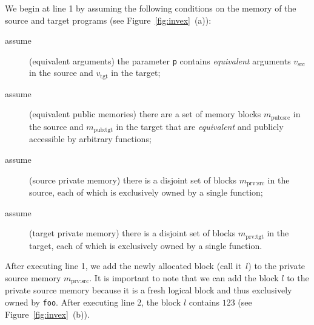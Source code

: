 We begin at line 1 by assuming the
following conditions on the memory of the source and target programs (see Figure~\ref{fig:invex}~(a)):
\begin{description}
\item[assume] (equivalent arguments) the parameter \texttt{p} contains
  \emph{equivalent} arguments $v_\textrm{src} $ in the source and $v_\textrm{tgt}$ in the target;
\item[assume] (equivalent public memories) 
  there are a set of memory blocks
  $m_\textrm{pub:src}$ in the source and
  $m_\textrm{pub:tgt}$ in the target that are
  \emph{equivalent} and publicly accessible by arbitrary functions;
\item[assume] (source private memory) 
  there is a disjoint set of blocks
  $m_\textrm{prv:src}$ in the source, each of which is
  exclusively owned by a single function;
\item[assume] (target private memory) 
  there is a disjoint set of blocks
  $m_\textrm{prv:tgt}$ in the target, each of which is
  exclusively owned by a single function.
\end{description}
After executing line 1, we add the newly allocated block (call it~$l$) to
the private source memory $m_\textrm{prv:src}$. It is important to note that we can add the
block $l$ to the private source memory because it is a fresh logical
block and thus exclusively owned by \texttt{foo}.  After executing
line 2, the block $l$ contains $123$ (see Figure~\ref{fig:invex}~(b)).

